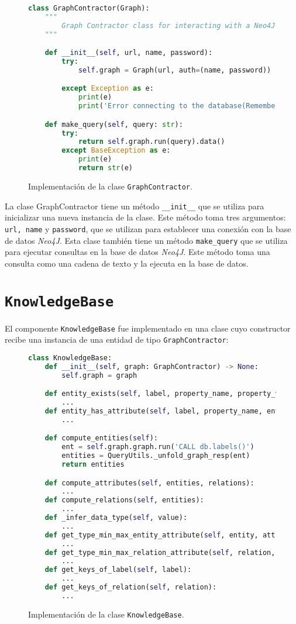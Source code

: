 \begin{figure}[H]
\begin{lstlisting}[language=python]
class GraphContractor(Graph):
    """
        Graph Contractor class for interacting with a Neo4J DB instance
    """

    def __init__(self, url, name, password):
        try:
            self.graph = Graph(url, auth=(name, password))

        except Exception as e:
            print(e)
            print('Error connecting to the database(Remember VPN)')

    def make_query(self, query: str):
        try:
            return self.graph.run(query).data()
        except BaseException as e:
            print(e)
            return str(e)
\end{lstlisting}
\caption{Implementación de la clase \texttt{GraphContractor}.}
\end{figure}

La clase GraphContractor tiene un método \texttt{\_\_init\_\_} que se utiliza para inicializar una nueva instancia de la clase. Este método toma tres argumentos: \texttt{url, name} y \texttt{password}, que se utilizan para establecer una conexión con la base de datos \textit{Neo4J}. Esta clase también tiene un método \texttt{make\_query} que se utiliza para ejecutar consultas en la base de datos \textit{Neo4J}. Este método toma una consulta como una cadena de texto y la ejecuta en la base de datos.

\section{\texttt{KnowledgeBase}}

El componente \texttt{KnowledgeBase} fue implementado en una clase cuyo constructor recibe una instancia de una entidad de tipo \texttt{GraphContractor}:

\begin{figure}[H]
\begin{lstlisting}[language=python]
class KnowledgeBase:
	def __init__(self, graph: GraphContractor) -> None:
        self.graph = graph

    def entity_exists(self, label, property_name, property_value):
    	...
	def entity_has_attribute(self, label, property_name, entity_name):
    	...

	def compute_entities(self):
        ent = self.graph.graph.run('CALL db.labels()')
        entities = QueryUtils._unfold_graph_resp(ent)
        return entities

	def compute_attributes(self, entities, relations):
		...
	def compute_relations(self, entities):
		...
	def _infer_data_type(self, value):
		...
	def get_type_min_max_entity_attribute(self, entity, attribute_name):
		...
	def get_type_min_max_relation_attribute(self, relation, attribute_name):
		...
	def get_keys_of_label(self, label):
		...
	def get_keys_of_relation(self, relation):
		...
\end{lstlisting}
\caption{Implementación de la clase \texttt{KnowledgeBase}.}
\label{code:kbimage}
\end{figure}

